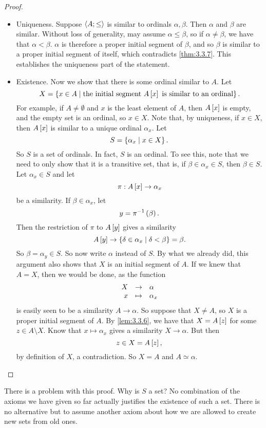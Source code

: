 \begin{proof}
\hfill
\begin{itemize}
\item Uniqueness. Suppose $ \ab{A; \le} $ is similar to ordinals $ \alpha, \beta $. Then $ \alpha $ and $ \beta $ are similar. Without loss of generality, may assume $ \alpha \le \beta $, so if $ \alpha \ne \beta $, we have that $ \alpha < \beta $. $ \alpha $ is therefore a proper initial segment of $ \beta $, and so $ \beta $ is similar to a proper initial segment of itself, which contradicts \ref{thm:3.3.7}. This establishes the uniqueness part of the statement.
\item Existence. Now we show that there is some ordinal similar to $ A $. Let
$$ X = \cb{x \in A \mid \text{the initial segment} \ A\sb{x} \ \text{is similar to an ordinal}}. $$
For example, if $ A \ne \emptyset $ and $ x $ is the least element of $ A $, then $ A\sb{x} $ is empty, and the empty set is an ordinal, so $ x \in X $. Note that, by uniqueness, if $ x \in X $, then $ A\sb{x} $ is similar to a unique ordinal $ \alpha_x $. Let
$$ S = \cb{\alpha_x \mid x \in X}. $$
So $ S $ is a set of ordinals. In fact, $ S $ is an ordinal. To see this, note that we need to only show that it is a transitive set, that is, if $ \beta \in \alpha_x \in S $, then $ \beta \in S $. Let $ \alpha_x \in S $ and let
$$ \pi : A\sb{x} \to \alpha_x $$
be a similarity. If $ \beta \in \alpha_x $, let
$$ y = \pi^{-1}\rb{\beta}. $$
Then the restriction of $ \pi $ to $ A\sb{y} $ gives a similarity
$$ A\sb{y} \to \cb{\delta \in \alpha_x \mid \delta < \beta} = \beta. $$
So $ \beta = \alpha_y \in S $. So now write $ \alpha $ instead of $ S $. By what we already did, this argument also shows that $ X $ is an initial segment of $ A $. If we knew that $ A = X $, then we would be done, as the function
$$ \function{X}{\alpha}{x}{\alpha_x} $$
is easily seen to be a similarity $ A \to \alpha $. So suppose that $ X \ne A $, so $ X $ is a proper initial segment of $ A $. By \ref{lem:3.3.6}, we have that $ X = A\sb{z} $ for some $ z \in A \setminus X $. Know that $ x \mapsto \alpha_x $ gives a similarity $ X \to \alpha $. But then
$$ z \in X = A\sb{z}, $$
by definition of $ X $, a contradiction. So $ X = A $ and $ A \simeq \alpha $.
\end{itemize}
\end{proof}


There is a problem with this proof. Why is $ S $ a set? No combination of the axioms we have given so far actually justifies the existence of such a set. There is no alternative but to assume another axiom about how we are allowed to create new sets from old ones.


